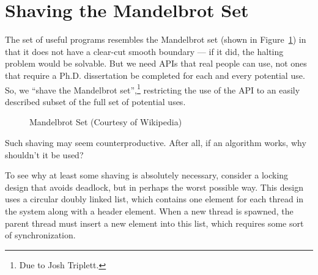 \section{Shaving the Mandelbrot Set}
\label{sec:easy:Shaving the Mandelbrot Set}

The set of useful programs resembles the Mandelbrot set
(shown in Figure~\ref{fig:easy:Mandelbrot Set})
in that it does
not have a clear-cut smooth boundary --- if it did, the halting problem
would be solvable.
But we need APIs that real people can use, not ones that require a
Ph.D. dissertation be completed for each and every potential use.
So, we ``shave the Mandelbrot set'',\footnote{
	Due to Josh Triplett.}
restricting the use of the
API to an easily described subset of the full set of potential uses.

\begin{figure}[htb]
\begin{center}
\end{center}
\caption{Mandelbrot Set (Courtesy of Wikipedia)}
\label{fig:easy:Mandelbrot Set}
\end{figure}

Such shaving may seem counterproductive.
After all, if an algorithm works, why shouldn't it be used?

To see why at least some shaving is absolutely necessary, consider
a locking design that avoids deadlock, but in perhaps the worst possible way.
This design uses a circular doubly linked list, which contains one
element for each thread in the system along with a header element.
When a new thread is spawned, the parent thread must insert a new
element into this list, which requires some sort of synchronization.

